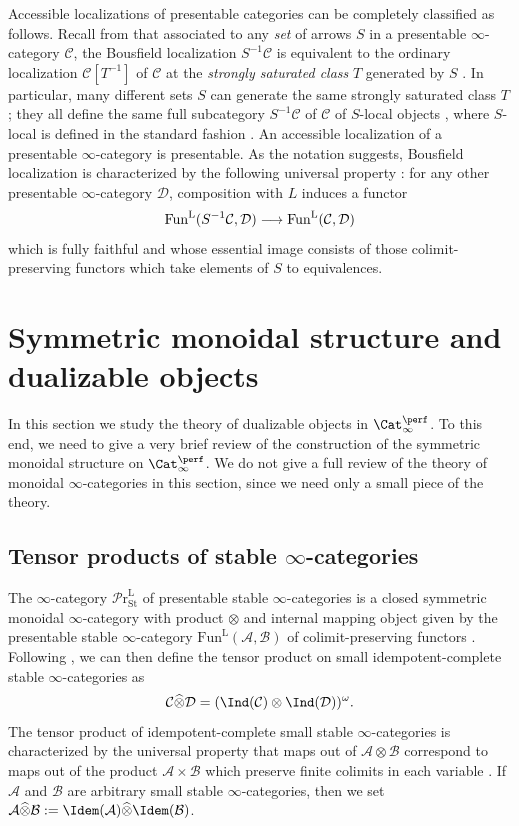 \documentclass{amsart}
\renewcommand{\to}{\mathchoice{\longrightarrow}{\rightarrow}{\rightarrow}{\rightarrow}}
\let\catsymbfont\mathcal
\newcommand{\aA}{{\catsymbfont{A}}}
\newcommand{\aB}{{\catsymbfont{B}}}
\newcommand{\aC}{{\catsymbfont{C}}}
\newcommand{\aD}{{\catsymbfont{D}}}
\renewcommand{\L}{\mathrm{L}}
\newcommand{\idemstabcat}{\Cat_\i^{\perf}}
\newcommand{\idemtimes}{\widehat{\otimes}}
\newcommand{\stabprcat}{{{\mathcal{P}\mathrm{r}}^{\mathrm{L}}_\mathrm{St}}}
\newcommand{\Fun}{\mathrm{Fun}} %
\renewcommand{\i}{\infty}
\numberwithin{equation}{section}
\theoremstyle{definition}
\begin{document}
Accessible localizations of presentable categories can be completely
classified as follows.  Recall from \cite[5.5.4]{HTT} that associated
to any {\em set} of arrows $S$ in a presentable $\i$-category $\aC$,
the Bousfield localization $S^{-1}\aC$ is equivalent to the ordinary
localization $\aC[T^{-1}]$ of $\aC$ at the {\em strongly saturated
class} $T$ generated by $S$ \cite[5.5.4.5]{HTT}.  In particular, many
different sets $S$ can generate the same strongly saturated class $T$;
they all define the same full subcategory $S^{-1}\aC$ of $\aC$ of
$S$-local objects \cite[5.5.4.15]{HTT}, where $S$-local is defined in
the standard fashion \cite[5.5.4.1]{HTT}.  An accessible localization
of a presentable $\i$-category is presentable.  As the notation
suggests, Bousfield localization is characterized by the following
universal property \cite[5.5.4.20]{HTT}: for any other presentable
$\i$-category $\aD$, composition with $L$ induces a functor
\[
\Fun^{\L}(S^{-1}\aC, \aD) \to \Fun^{\L}(\aC, \aD)
\]
which is fully faithful and whose essential image consists of those
colimit-preserving functors which take elements of $S$ to equivalences.

\section{Symmetric monoidal structure and dualizable objects}\label{sec:monoidal}

In this section we study the theory of dualizable objects in
$\idemstabcat$.  To this end, we need to give a very brief review of
the construction of the symmetric monoidal structure on
$\idemstabcat$.  We do not give a full review of the theory of
monoidal $\i$-categories in this section, since we need only a small
piece of the theory.

\subsection{Tensor products of stable $\i$-categories}
The $\i$-category $\stabprcat$ of presentable stable $\i$-categories is a
closed symmetric monoidal $\i$-category with product $\otimes$ and internal
mapping object given by the presentable stable $\i$-category
$\Fun^{\L}(\aA,\aB)$ of colimit-preserving functors \cite[6.3.1.14,
6.3.1.17]{HAG}.  Following \cite[\S 4.1.2]{BFN}, we can then define
the tensor product on small idempotent-complete stable $\i$-categories
as
\[
\aC \idemtimes \aD = (\Ind(\aC) \otimes \Ind(\aD))^{\omega}.
\]
The tensor product of idempotent-complete small stable $\i$-categories
is characterized by the universal property that maps out of $\aA
\otimes \aB$ correspond to maps out of the product $\aA \times \aB$
which preserve finite colimits in each variable \cite[4.4]{BFN}.
If $\aA$ and $\aB$ are arbitrary small stable $\i$-categories, then we set $\aA\idemtimes\aB:=\Idem(\aA)\idemtimes\Idem(\aB)$.
\end{document}
